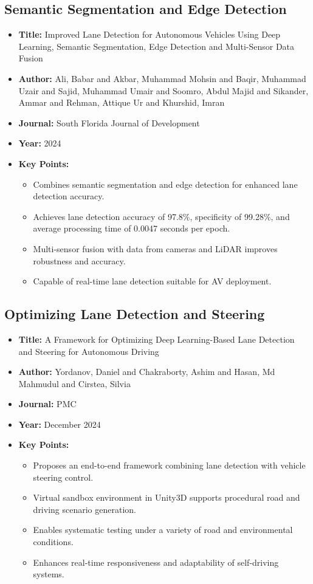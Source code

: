 \subsection{Semantic Segmentation and Edge Detection}
\begin{itemize}
    \item \textbf{Title:} Improved Lane Detection for Autonomous Vehicles Using Deep Learning, Semantic Segmentation, Edge Detection and Multi-Sensor Data Fusion \cite{ali2024improved}
    \item \textbf{Author:} Ali, Babar and Akbar, Muhammad Mohsin and Baqir, Muhammad Uzair and Sajid, Muhammad Umair and Soomro, Abdul Majid and Sikander, Ammar and Rehman, Attique Ur and Khurshid, Imran
    \item \textbf{Journal:} South Florida Journal of Development
    \item \textbf{Year:} 2024
    \item \textbf{Key Points:}
    \begin{itemize}
        \item Combines semantic segmentation and edge detection for enhanced lane detection accuracy.
        \item Achieves lane detection accuracy of 97.8\%, specificity of 99.28\%, and average processing time of 0.0047 seconds per epoch.
        \item Multi-sensor fusion with data from cameras and LiDAR improves robustness and accuracy.
        \item Capable of real-time lane detection suitable for AV deployment.
    \end{itemize}
\end{itemize}

\subsection{Optimizing Lane Detection and Steering}
\begin{itemize}
    \item \textbf{Title:} A Framework for Optimizing Deep Learning-Based Lane Detection and Steering for Autonomous Driving \cite{yordanov2024framework}
    \item \textbf{Author:} Yordanov, Daniel and Chakraborty, Ashim and Hasan, Md Mahmudul and Cirstea, Silvia
    \item \textbf{Journal:} PMC
    \item \textbf{Year:} December 2024
    \item \textbf{Key Points:}
    \begin{itemize}
        \item Proposes an end-to-end framework combining lane detection with vehicle steering control.
        \item Virtual sandbox environment in Unity3D supports procedural road and driving scenario generation.
        \item Enables systematic testing under a variety of road and environmental conditions.
        \item Enhances real-time responsiveness and adaptability of self-driving systems.
    \end{itemize}
\end{itemize}

